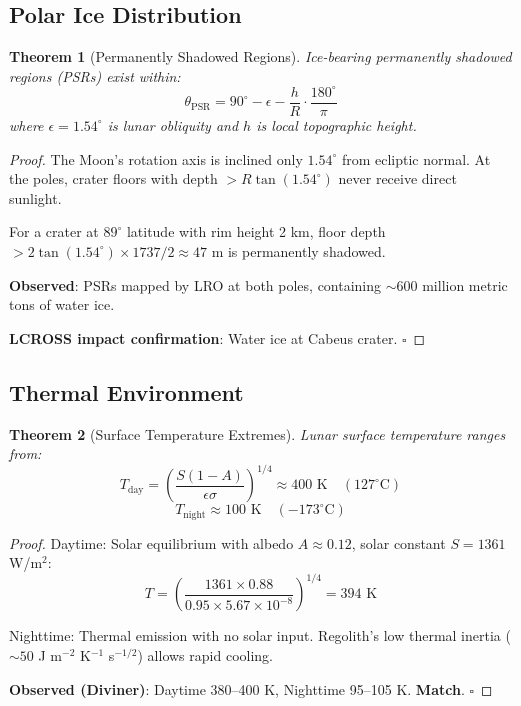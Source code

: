 \documentclass[12pt,a4paper]{article}
\newtheorem{theorem}{Theorem}[section]
\theoremstyle{definition}
\theoremstyle{remark}
\begin{document}
\subsection{Polar Ice Distribution}

\begin{theorem}[Permanently Shadowed Regions]
\label{thm:psr}
Ice-bearing permanently shadowed regions (PSRs) exist within:
\begin{equation}
\theta_{\text{PSR}} = 90^\circ - \epsilon - \frac{h}{R} \cdot \frac{180^\circ}{\pi}
\end{equation}
where $\epsilon = 1.54^\circ$ is lunar obliquity and $h$ is local topographic height.
\end{theorem}

\begin{proof}
The Moon's rotation axis is inclined only $1.54^\circ$ from ecliptic normal. At the poles, crater floors with depth $> R\tan(1.54^\circ)$ never receive direct sunlight.

For a crater at $89^\circ$ latitude with rim height 2 km, floor depth $> 2\tan(1.54^\circ) \times 1737/2 \approx 47$ m is permanently shadowed.

\textbf{Observed}: PSRs mapped by LRO at both poles, containing $\sim 600$ million metric tons of water ice.

\textbf{LCROSS impact confirmation}: Water ice at Cabeus crater. $\square$
\end{proof}

\subsection{Thermal Environment}

\begin{theorem}[Surface Temperature Extremes]
\label{thm:thermal}
Lunar surface temperature ranges from:
\begin{equation}
T_{\text{day}} = \left(\frac{S(1-A)}{\epsilon\sigma}\right)^{1/4} \approx 400 \text{ K} \quad (127^\circ\text{C})
\end{equation}
\begin{equation}
T_{\text{night}} \approx 100 \text{ K} \quad (-173^\circ\text{C})
\end{equation}
\end{theorem}

\begin{proof}
Daytime: Solar equilibrium with albedo $A \approx 0.12$, solar constant $S = 1361$ W/m$^2$:
\begin{equation}
T = \left(\frac{1361 \times 0.88}{0.95 \times 5.67 \times 10^{-8}}\right)^{1/4} = 394 \text{ K}
\end{equation}

Nighttime: Thermal emission with no solar input. Regolith's low thermal inertia ($\sim 50$ J m$^{-2}$ K$^{-1}$ s$^{-1/2}$) allows rapid cooling.

\textbf{Observed (Diviner)}: Daytime 380--400 K, Nighttime 95--105 K. \textbf{Match}. $\square$
\end{proof}
\end{document}
